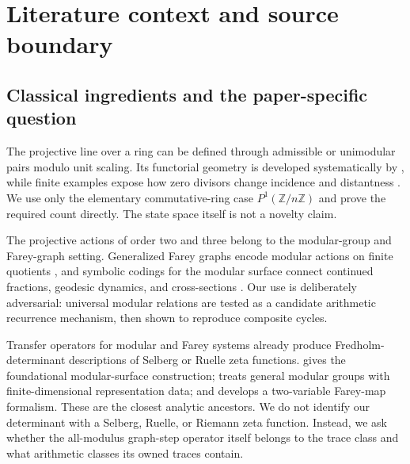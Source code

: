 \section{Literature context and source boundary}
\label{sec:literature-source}

\subsection{Classical ingredients and the paper-specific question}

The projective line over a ring can be defined through admissible or
unimodular pairs modulo unit scaling.  Its functorial geometry is developed
systematically by \citet{blunck2000projective}, while finite examples expose
how zero divisors change incidence and distantness
\citep{saniga2007classification}.  We use only the elementary commutative-ring
case $P^1(\mathbb Z/n\mathbb Z)$ and prove the required count directly.  The
state space itself is not a novelty claim.

The projective actions of order two and three belong to the modular-group and
Farey-graph setting.  Generalized Farey graphs encode modular actions on
finite quotients \citep{jones1991modular}, and symbolic codings for the
modular surface connect continued fractions, geodesic dynamics, and
cross-sections \citep{katok2006symbolic}.  Our use is deliberately
adversarial: universal modular relations are tested as a candidate
arithmetic recurrence mechanism, then shown to reproduce composite cycles.

Transfer operators for modular and Farey systems already produce
Fredholm-determinant descriptions of Selberg or Ruelle zeta functions.
\citet{mayer1991thermodynamic} gives the foundational modular-surface
construction; \citet{chang2001extension} treats general modular groups with
finite-dimensional representation data; and \citet{bonanno2014thermodynamic}
develops a two-variable Farey-map formalism.  These are the closest analytic
ancestors.  We do not identify our determinant with a Selberg, Ruelle, or
Riemann zeta function.  Instead, we ask whether the all-modulus graph-step
operator itself belongs to the trace class and what arithmetic classes its
owned traces contain.

